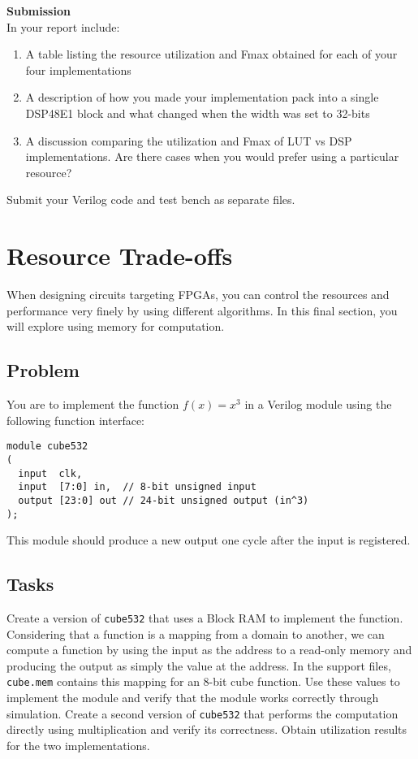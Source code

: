 \documentclass{article}
\begin{document}
\medskip
\begin{minipage}{\textwidth}
\noindent\textbf{Submission}\\
In your report include:
\begin{enumerate}
\item A table listing the resource utilization and Fmax obtained for each of your four implementations
\item A description of how you made your implementation pack into a single DSP48E1 block and what changed when the width was set to 32-bits
\item A discussion comparing the utilization and Fmax of LUT vs DSP implementations. Are there cases when you would prefer using a particular resource?
\end{enumerate}
Submit your Verilog code and test bench as separate files.
\end{minipage}

\section{Resource Trade-offs}

When designing circuits targeting FPGAs, you can control the resources and performance very finely by using different algorithms.
In this final section, you will explore using memory for computation.

\subsection{Problem}

You are to implement the function $f(x) = x^3$ in a Verilog module using the following function interface:
\begin{verbatim}
module cube532
(
  input  clk,
  input  [7:0] in,  // 8-bit unsigned input
  output [23:0] out // 24-bit unsigned output (in^3)
);
\end{verbatim}
This module should produce a new output one cycle after the input is registered.

\subsection{Tasks}
Create a version of \verb|cube532| that uses a Block RAM to implement the function.
Considering that a function is a mapping from a domain to another, we can compute a function by using the input as the address to a read-only memory and producing the output as simply the value at the address.
In the support files, \verb|cube.mem| contains this mapping for an 8-bit cube function.
Use these values to implement the module and verify that the module works correctly through simulation.
Create a second version of \verb|cube532| that performs the computation directly using multiplication and verify its correctness.
Obtain utilization results for the two implementations.
\end{document}
